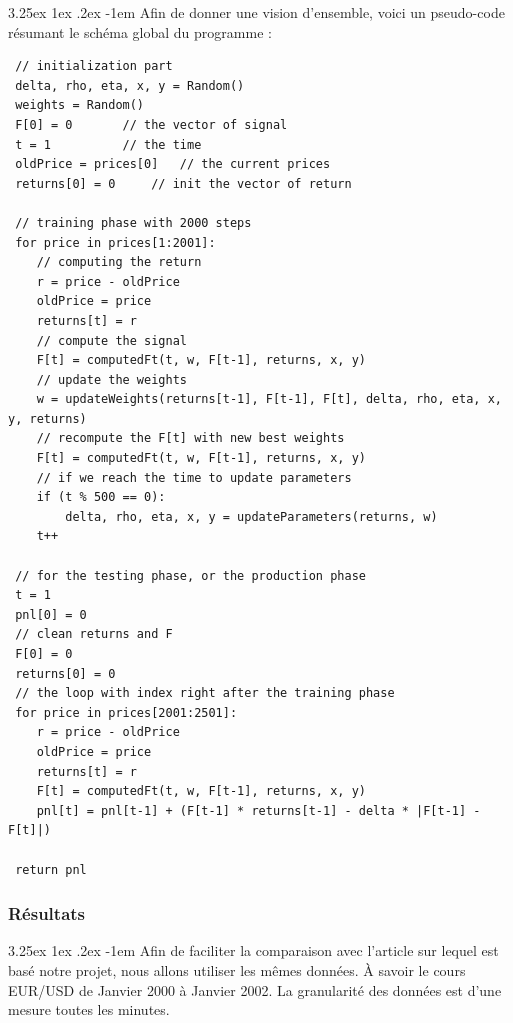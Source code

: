\documentclass[a4paper, 11pt]{article}
\makeatletter
\renewcommand\paragraph{\@startsection{paragraph}{5}{\z@}%
  {3.25ex \@plus1ex \@minus.2ex}%
  {-1em}%
  {\normalfont\normalsize\bfseries}}
\makeatother
\begin{document}
\paragraph{}
Afin de donner une vision d'ensemble, voici un pseudo-code résumant le schéma global du programme :
  \begin{lstlisting}
 // initialization part
 delta, rho, eta, x, y = Random()
 weights = Random()
 F[0] = 0		// the vector of signal
 t = 1			// the time
 oldPrice = prices[0]	// the current prices
 returns[0] = 0		// init the vector of return
 
 // training phase with 2000 steps
 for price in prices[1:2001]:
 	// computing the return
 	r = price - oldPrice
 	oldPrice = price
 	returns[t] = r
 	// compute the signal
 	F[t] = computedFt(t, w, F[t-1], returns, x, y)
 	// update the weights
 	w = updateWeights(returns[t-1], F[t-1], F[t], delta, rho, eta, x, y, returns)
 	// recompute the F[t] with new best weights
 	F[t] = computedFt(t, w, F[t-1], returns, x, y)
 	// if we reach the time to update parameters
 	if (t % 500 == 0):
 		delta, rho, eta, x, y = updateParameters(returns, w)
 	t++
 
 // for the testing phase, or the production phase
 t = 1
 pnl[0] = 0
 // clean returns and F
 F[0] = 0
 returns[0] = 0
 // the loop with index right after the training phase
 for price in prices[2001:2501]:
 	r = price - oldPrice
 	oldPrice = price
 	returns[t] = r
 	F[t] = computedFt(t, w, F[t-1], returns, x, y)
 	pnl[t] = pnl[t-1] + (F[t-1] * returns[t-1] - delta * |F[t-1] - F[t]|)
 
 return pnl
  \end{lstlisting}
 
\subsubsection{Résultats}
 \paragraph{}
 Afin de faciliter la comparaison avec l'article sur lequel est basé notre projet, nous allons utiliser les mêmes données. À savoir le cours EUR/USD de Janvier 2000 à Janvier 2002. La granularité des données est d'une mesure toutes les minutes.
 
\end{document}
